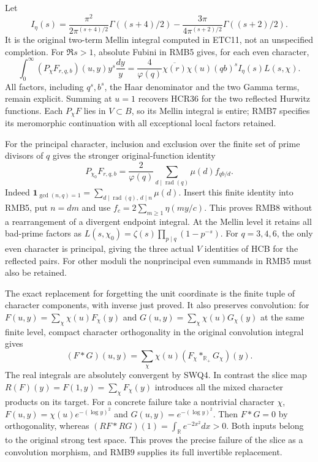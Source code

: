 Let
\begin{equation}\tag{RMB6}
 I_\eta(s)=
 \frac{\pi^2}{2\pi^{(s+4)/2}}\Gamma((s+4)/2)
 -\frac{3\pi}{4\pi^{(s+2)/2}}\Gamma((s+2)/2).
\end{equation}
It is the original two-term Mellin integral computed in ETC11,
not an unspecified completion. For $\Re s>1$, absolute
Fubini in RMB5 gives, for each even character,
\begin{equation}\tag{RMB7}
 \int_0^\infty(P_\chi F_{r,q,b})(u,y)y^s\frac{dy}{y}
  =\frac4{\varphi(q)}\overline{\chi(r)}\chi(u)
                       (qb)^s I_\eta(s)L(s,\chi).
\end{equation}
All factors, including $q^s,b^s$, the Haar denominator and
the two Gamma terms, remain explicit. Summing at $u=1$
recovers HCR36 for the two reflected Hurwitz functions.
Each $P_\chi F$ lies in $V\subset B$, so its Mellin integral
is entire; RMB7 specifies its meromorphic continuation with
all exceptional local factors retained.

For the principal character, inclusion and exclusion over the
finite set of prime divisors of $q$ gives the stronger
original-function identity
\begin{equation}\tag{RMB8}
 P_{\chi_0}F_{r,q,b}
  =\frac2{\varphi(q)}
     \sum_{d\mid\operatorname{rad}(q)}\mu(d)f_{qb/d}.
\end{equation}
Indeed $\mathbf1_{\gcd(n,q)=1}
=\sum_{d\mid\operatorname{rad}(q),\,d\mid n}\mu(d)$.
Insert this finite identity into RMB5, put $n=dm$ and use
$f_c=2\sum_{m\ge1}\eta(my/c)$. This proves RMB8
without a rearrangement of a divergent endpoint integral.
At the Mellin level it retains all bad-prime factors as
$L(s,\chi_0)=\zeta(s)\prod_{p\mid q}(1-p^{-s})$.
For $q=3,4,6$, the only even character is principal, giving
the three actual $V$ identities of HCB for the reflected pairs.
For other moduli the nonprincipal even summands in RMB5
must also be retained.

The exact replacement for forgetting the unit coordinate is
the finite tuple of character components, with inverse just
proved. It also preserves convolution: for
$F(u,y)=\sum_\chi\chi(u)F_\chi(y)$ and
$G(u,y)=\sum_\chi\chi(u)G_\chi(y)$ at the same finite level,
compact character orthogonality in the original convolution
integral gives
\begin{equation}\tag{RMB9}
 (F*G)(u,y)=\sum_\chi\chi(u)
                      (F_\chi*_{\mathbb R_+}G_\chi)(y).
\end{equation}
The real integrals are absolutely convergent by SWQ4.
In contrast the slice map $R(F)(y)=F(1,y)=\sum_\chi F_\chi(y)$
introduces all the mixed character products on its target.
For a concrete failure take a nontrivial character $\chi$,
$F(u,y)=\chi(u)e^{-(\log y)^2}$ and
$G(u,y)=e^{-(\log y)^2}$. Then $F*G=0$ by orthogonality,
whereas $(RF*RG)(1)=\int_{\mathbb R}e^{-2x^2}dx>0$.
Both inputs belong to the original strong test space. This
proves the precise failure of the slice as a convolution
morphism, and RMB9 supplies its full invertible replacement.

